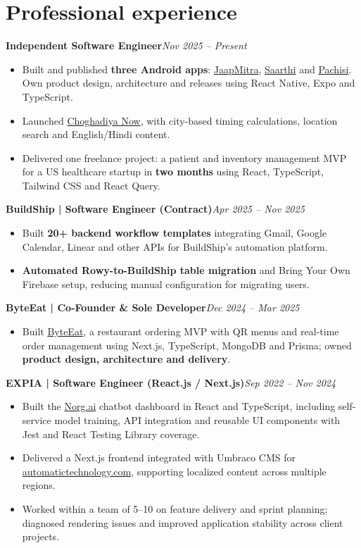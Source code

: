 \documentclass[a4paper,10pt]{article}
\newcommand{\job}[2]{\textbf{#1}\hfill\textit{#2}}
\begin{document}
\section{Professional experience}
\job{Independent Software Engineer}{Nov 2025 -- Present}
\begin{itemize}
\item Built and published \textbf{three Android apps}: \href{https://play.google.com/store/apps/details?id=com.g1mishra.jaapmitra}{JaapMitra}, \href{https://play.google.com/store/apps/details?id=com.g1mishra.saarthi}{Saarthi} and \href{https://play.google.com/store/apps/details?id=com.g1mishra.pachisi}{Pachisi}. Own product design, architecture and releases using React Native, Expo and TypeScript.
\item Launched \href{https://choghadiyanow.com/}{Choghadiya Now}, with city-based timing calculations, location search and English/Hindi content.
\item Delivered one freelance project: a patient and inventory management MVP for a US healthcare startup in \textbf{two months} using React, TypeScript, Tailwind CSS and React Query.
\end{itemize}
\job{BuildShip | Software Engineer (Contract)}{Apr 2025 -- Nov 2025}
\begin{itemize}
\item Built \textbf{20+ backend workflow templates} integrating Gmail, Google Calendar, Linear and other APIs for BuildShip's automation platform.
\item \textbf{Automated Rowy-to-BuildShip table migration} and Bring Your Own Firebase setup, reducing manual configuration for migrating users.
\end{itemize}
\job{ByteEat | Co-Founder \& Sole Developer}{Dec 2024 -- Mar 2025}
\begin{itemize}
\item Built \href{https://byteeat.vercel.app}{ByteEat}, a restaurant ordering MVP with QR menus and real-time order management using Next.js, TypeScript, MongoDB and Prisma; owned \textbf{product design, architecture and delivery}.
\end{itemize}
\job{EXPIA | Software Engineer (React.js / Next.js)}{Sep 2022 -- Nov 2024}
\begin{itemize}
\item Built the \href{https://norg.ai}{Norg.ai} chatbot dashboard in React and TypeScript, including self-service model training, API integration and reusable UI components with Jest and React Testing Library coverage.
\item Delivered a Next.js frontend integrated with Umbraco CMS for \href{https://www.automatictechnology.com}{automatictechnology.com}, supporting localized content across multiple regions.
\item Worked within a team of 5--10 on feature delivery and sprint planning; diagnosed rendering issues and improved application stability across client projects.
\end{itemize}
\end{document}
